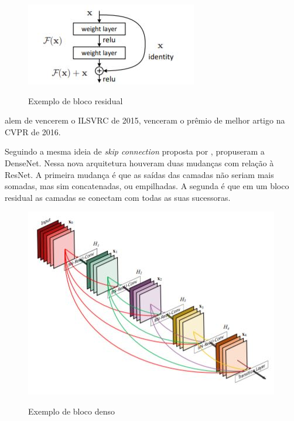 \begin{figure}[H]
	\setlength{\abovecaptionskip}{0pt}
	\setlength{\belowcaptionskip}{0pt}
	\caption[Exemplo de bloco residual]{Exemplo de bloco residual}
	\centering
	\includegraphics[width=.5\textwidth]{imagem/0x_resnet_arch.jpg}
	\captionsetup{justification=centering}
	\label{fig:blocoresidual}
\end{figure}

 alem de vencerem o \ac{ILSVRC} de 2015, venceram o prêmio de melhor artigo na \ac{CVPR} de 2016.

Seguindo a mesma ideia de \textit{skip connection} proposta por ,  propuseram a \ac{DenseNet}. Nessa nova arquitetura houveram duas mudanças com relação à \ac{ResNet}. A primeira mudança é que as saídas das camadas não seriam mais somadas, mas sim concatenadas, ou empilhadas. A segunda é que em um bloco residual as camadas se conectam com todas as suas sucessoras. 

\begin{figure}[H]
	\setlength{\abovecaptionskip}{0pt}
	\setlength{\belowcaptionskip}{0pt}
	\caption[Exemplo de bloco denso]{Exemplo de bloco denso}
	\centering
	\includegraphics[width=.5\textwidth]{imagem/0x_densenet_block.jpg}
	\captionsetup{justification=centering}
	\label{fig:blocodenso}
\end{figure}

